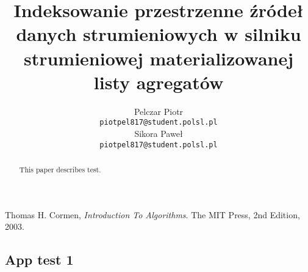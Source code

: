 \documentclass[12pt]{article}
\title{Indeksowanie przestrzenne źródeł danych strumieniowych w silniku strumieniowej materializowanej listy agregatów}
\author{
	  Pelczar Piotr\\
	  \small{\texttt{piotpel817@student.polsl.pl}}
	  \\[3ex]
	  Sikora Paweł\\
	  \small{\texttt{piotpel817@student.polsl.pl}}
	}
\date{\displaydate{date}}
\begin{document}
\maketitle
 
\begin{abstract}
This paper describes test.
\end{abstract}

\renewcommand{\contentsname}{Contents}

\newpage
\tableofcontents

\newpage











\newpage
\begin{thebibliography}{9}

  Thomas H. Cormen,
  \emph{Introduction To Algorithms}.
  The MIT Press,
  2nd Edition,
  2003.

\end{thebibliography}

\begin{appendices}
	\section{App test 1}
	\label{app:appTest1}

\end{appendices}
\end{document}
